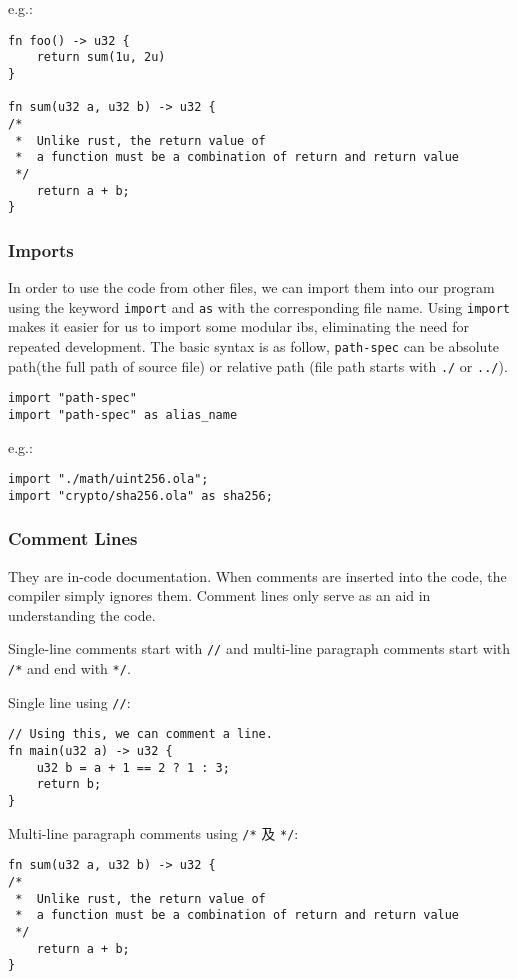 e.g.:

\begin{lstlisting}
fn foo() -> u32 {
    return sum(1u, 2u)
}

fn sum(u32 a, u32 b) -> u32 {
/* 
 *  Unlike rust, the return value of 
 *  a function must be a combination of return and return value
 */
    return a + b;
}
\end{lstlisting}

\subsubsection{Imports}

In order to use the code from other files, we can import them into our program using the keyword \verb|import| and \verb|as| with the corresponding file name.
Using \verb|import| makes it easier for us to import some modular ibs, eliminating the need for repeated development.
The basic syntax is as follow, \verb|path-spec| can be absolute path(the full path of source file) or relative path (file path starts with \verb|./| or \verb|../|).

\begin{lstlisting}
import "path-spec"
import "path-spec" as alias_name
\end{lstlisting}

e.g.:

\begin{lstlisting}
import "./math/uint256.ola";
import "crypto/sha256.ola" as sha256;
\end{lstlisting}

\subsubsection{Comment Lines}

They are in-code documentation. When comments are inserted into the code, the compiler simply ignores them. Comment lines only serve as an aid in understanding the code.

Single-line comments start with \texttt{//} and multi-line paragraph comments start with \texttt{/*} and end with \texttt{*/}.

Single line using \texttt{//}:
\begin{lstlisting}
// Using this, we can comment a line.
fn main(u32 a) -> u32 {
    u32 b = a + 1 == 2 ? 1 : 3;
    return b;
}
\end{lstlisting}

Multi-line paragraph comments using \texttt{/*} 及 \texttt{*/}:
\begin{lstlisting}
fn sum(u32 a, u32 b) -> u32 {
/* 
 *  Unlike rust, the return value of 
 *  a function must be a combination of return and return value
 */
    return a + b;
}
\end{lstlisting}




